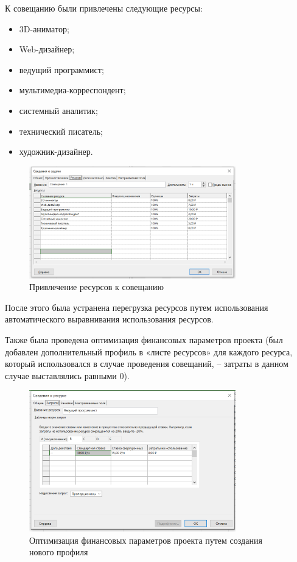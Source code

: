 К совещанию были привлечены следующие ресурсы:

\begin{itemize}
    \item 3D-аниматор;
    \item Web-дизайнер;
    \item ведущий программист;
    \item мультимедиа-корреспондент;
    \item системный аналитик;
    \item технический писатель;
    \item художник-дизайнер.
\end{itemize}

\begin{figure}[H]
    \centering
    \includegraphics[width=0.8\textwidth]{img/content/task_2_resources.png}
    \caption{Привлечение ресурсов к совещанию}
    \label{fig:task_2_resources}
\end{figure}

После этого была устранена перегрузка ресурсов путем использования автоматического выравнивания использования ресурсов.

Также была проведена оптимизация финансовых параметров проекта (был добавлен дополнительный профиль в «листе ресурсов» для каждого ресурса, который использовался в случае проведения совещаний, – затраты в данном случае выставлялись равными 0).

\begin{figure}[H]
    \centering
    \includegraphics[width=0.8\textwidth]{img/content/task_2_resource_B.png}
    \caption{Оптимизация финансовых параметров проекта путем создания нового профиля}
    \label{fig:task_2_resource_B}
\end{figure}


